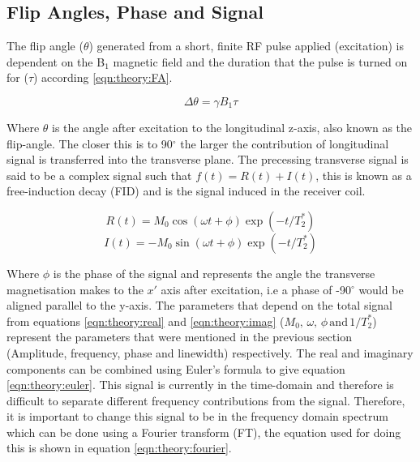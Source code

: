 \documentclass[class=article, crop=false]{standalone}
\begin{document}
\subsection{Flip Angles, Phase and Signal}

The flip angle ($\theta$) generated from a short, finite RF pulse applied (excitation) is dependent on the B$_1$ magnetic field and the duration that the pulse is turned on for ($\tau$) according \ref{eqn:theory:FA}.

\begin{equation}
    \Delta\theta = \gamma B_1 \tau
    \label{eqn:theory:FA}
\end{equation}

Where $\theta$ is the angle after excitation to the longitudinal z-axis, also known as the flip-angle. The closer this is to 90$^\circ$ the larger the contribution of longitudinal signal is transferred into the transverse plane. The precessing transverse signal is said to be a complex signal such that $f(t) = R(t) + I(t)$, this is known as a free-induction decay (FID) and is the signal induced in the receiver coil.

\begin{equation}
    R(t) = M_0\cos(\omega t+ \phi)\exp(-t/T_2^*)
    \label{eqn:theory:real}
\end{equation}
\begin{equation}
    I(t) = -M_0\sin(\omega t+ \phi)\exp(-t/T_2^*)
    \label{eqn:theory:imag}
\end{equation}

Where $\phi$ is the phase of the signal and represents the angle the transverse magnetisation makes to the $x'$ axis after excitation, i.e a phase of -90$^\circ$ would be aligned parallel to the y-axis. The parameters that depend on the total signal from equations \ref{eqn:theory:real} and \ref{eqn:theory:imag} ($M_0, \, \omega, \, \phi \, \textrm{and} \, 1/T_2^*$) represent the parameters that were mentioned in the previous section (Amplitude, frequency, phase and linewidth) respectively. The real and imaginary components can be combined using Euler's formula to give equation \ref{eqn:theory:euler}. This signal is currently in the time-domain and therefore is difficult to separate different frequency contributions from the signal. Therefore, it is important to change this signal to be in the frequency domain spectrum which can be done using a Fourier transform \cite{Fourier1822TheorieChaleur} (FT), the equation used for doing this is shown in equation \ref{eqn:theory:fourier}.
\end{document}

